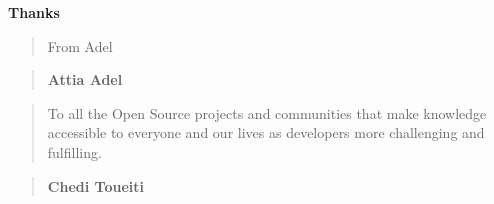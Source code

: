 \thispagestyle{empty}
\addtocounter{page}{-1}

\begin{center}
\textbf{Thanks}\\
\bigskip
\bigskip
\bigskip
\end{center}
\begin{quote}
\selectfont
From Adel
\end{quote}

\begin{quote}
\begin{flushright}
\selectfont 
\textbf{Attia Adel}
\end{flushright}
\end{quote}

\medskip 
	
\begin{quote}
\selectfont
To all the Open Source projects and communities that make knowledge accessible to everyone and our lives as developers more challenging and fulfilling.
\end{quote}

\begin{quote}
\begin{flushright}
\selectfont 
\textbf{Chedi Toueiti}
\end{flushright}
\end{quote}